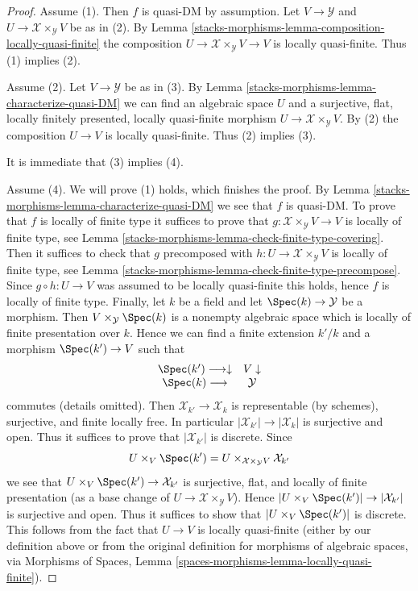 \begin{proof}
Assume (1). Then $f$ is quasi-DM by assumption. Let
$V \to \mathcal{Y}$ and $U \to \mathcal{X} \times_\mathcal{Y} V$
be as in (2). By
Lemma \ref{stacks-morphisms-lemma-composition-locally-quasi-finite}
the composition $U \to \mathcal{X} \times_\mathcal{Y} V \to V$ is
locally quasi-finite. Thus (1) implies (2).

\medskip\noindent
Assume (2). Let $V \to \mathcal{Y}$ be as in (3). By
Lemma \ref{stacks-morphisms-lemma-characterize-quasi-DM}
we can find an algebraic space $U$ and a surjective, flat, locally
finitely presented, locally quasi-finite morphism
$U \to \mathcal{X} \times_\mathcal{Y} V$. By (2) the composition
$U \to V$ is locally quasi-finite. Thus (2) implies (3).

\medskip\noindent
It is immediate that (3) implies (4).

\medskip\noindent
Assume (4). We will prove (1) holds, which finishes the proof. By
Lemma \ref{stacks-morphisms-lemma-characterize-quasi-DM}
we see that $f$ is quasi-DM. To prove that $f$ is locally of finite type
it suffices to prove that $g : \mathcal{X} \times_\mathcal{Y} V \to V$ is
locally of finite type, see
Lemma \ref{stacks-morphisms-lemma-check-finite-type-covering}.
Then it suffices to check that $g$ precomposed with
$h : U \to \mathcal{X} \times_\mathcal{Y} V$ is locally of finite type, see
Lemma \ref{stacks-morphisms-lemma-check-finite-type-precompose}.
Since $g \circ h : U \to V$ was assumed to be locally quasi-finite
this holds, hence $f$ is locally of finite type.
Finally, let $k$ be a field and let $\Spec(k) \to \mathcal{Y}$
be a morphism. Then $V \times_\mathcal{Y} \Spec(k)$ is
a nonempty algebraic space which is locally of finite presentation
over $k$. Hence we can find a finite extension $k'/k$ and
a morphism $\Spec(k') \to V$ such that
$$
\begin{array}{cc}\Spec(k') \longrightarrow\downarrow & V \downarrow \\ \Spec(k) \longrightarrow & \mathcal{Y}\end{array}
$$
commutes (details omitted). Then $\mathcal{X}_{k'} \to \mathcal{X}_k$
is representable (by schemes), surjective, and finite locally free. In
particular $|\mathcal{X}_{k'}| \to |\mathcal{X}_k|$ is surjective and open.
Thus it suffices to prove that $|\mathcal{X}_{k'}|$ is discrete. Since
$$
U \times_V \Spec(k') =
U \times_{\mathcal{X} \times_\mathcal{Y} V} \mathcal{X}_{k'}
$$
we see that $U \times_V \Spec(k') \to \mathcal{X}_{k'}$ is
surjective, flat, and locally of finite presentation (as a base change
of $U \to \mathcal{X} \times_\mathcal{Y} V$). Hence
$|U \times_V \Spec(k')| \to |\mathcal{X}_{k'}|$ is surjective and
open. Thus it suffices to show that $|U \times_V \Spec(k')|$ is
discrete. This follows from the fact that $U \to V$ is locally
quasi-finite (either by our definition above or from the original definition
for morphisms of algebraic spaces, via
Morphisms of Spaces, Lemma \ref{spaces-morphisms-lemma-locally-quasi-finite}).
\end{proof}

